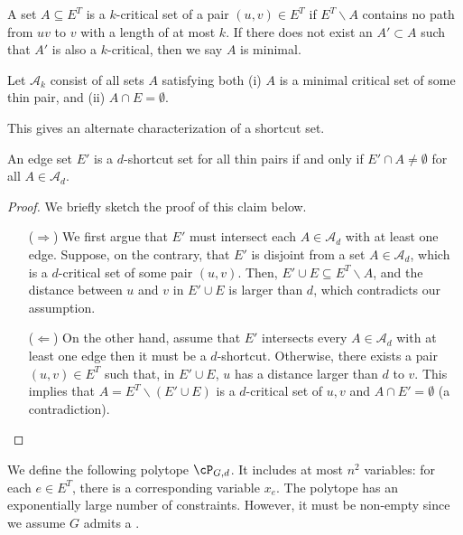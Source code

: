 \begin{definition}\label{def:antispanner}
A set $A\subseteq E^T$ is a $k$-critical set of a pair $(u,v)\in E^T$ if $E^T\backslash A$ contains no path from $uv$ to $v$ with a length of at most $k$. If there does not exist an $A'\subset A$ such that $A'$ is also a $k$-critical, then we say $A$ is minimal.
\end{definition}


\begin{definition}[$\mathcal{A}_k$]\label{def:antispannerset}
Let $\mathcal{A}_k$ consist of all sets $A$ satisfying both (i) $A$ is a minimal critical set of some thin pair, and (ii) $A\cap E=\emptyset$.
\end{definition}

This gives an alternate characterization of a shortcut set. 

\begin{claim} 
    An edge set $E'$ is a $d$-shortcut set for all thin pairs if and only if $E' \cap A \neq \emptyset$  for all $A\in\mathcal{A}_{d}$. 
\end{claim}

\begin{proof}
We briefly sketch the proof of this claim below.
\begin{itemize}
    \item[($\Rightarrow$)] We first argue that $E'$ must intersect each $A\in\mathcal{A}_d$ with at least one edge. Suppose, on the contrary, that $E'$ is disjoint from a set $A\in\mathcal{A}_d$, which is a $d$-critical set of some pair $(u,v)$. Then, $E'\cup E\subseteq E^T \backslash A$, and the distance between $u$ and $v$ in $E'\cup E$ is larger than $d$, which contradicts our assumption. 
    
    \item[($\Leftarrow$)] On the other hand, assume that $E'$ intersects every $A\in\mathcal{A}_d$ with at least one edge then it must be a $d$-shortcut. Otherwise, there exists a pair $(u,v)\in E^T $ such that, in $E'\cup E$, $u$ has a distance larger than $d$ to $v$. This implies that $A= E^T\backslash(E'\cup E)$ is a $d$-critical set of $u,v$ and $A \cap E' = \emptyset$ (a contradiction). 
\end{itemize}
\end{proof}


We define the following polytope $\cP_{G,d}$. It includes at most $n^2$ variables: for each $e\in E^T$, there is a corresponding variable $x_e$. The polytope has an exponentially large number of constraints. However, it must be non-empty since we assume $G$ admits a .


